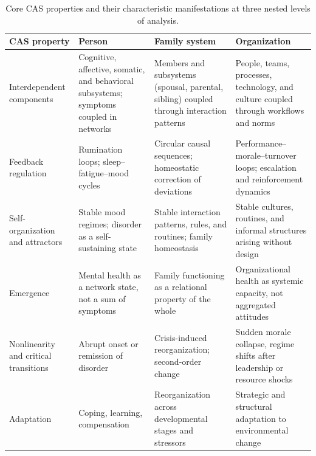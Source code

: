 \documentclass[12pt, letterpaper]{article}
\begin{document}
\begin{table}[htbp]
\centering
\small
\caption{Core CAS properties and their characteristic manifestations at three nested levels of analysis.}
\label{tab:cas-properties}
\begin{tabular}{p{2.9cm}p{3.6cm}p{3.6cm}p{3.8cm}}
\toprule
CAS property & Person & Family system & Organization \\
\midrule
Interdependent components & Cognitive, affective, somatic, and behavioral subsystems; symptoms coupled in networks & Members and subsystems (spousal, parental, sibling) coupled through interaction patterns & People, teams, processes, technology, and culture coupled through workflows and norms \\
\midrule
Feedback regulation & Rumination loops; sleep--fatigue--mood cycles & Circular causal sequences; homeostatic correction of deviations & Performance--morale--turnover loops; escalation and reinforcement dynamics \\
\midrule
Self-organization and attractors & Stable mood regimes; disorder as a self-sustaining state & Stable interaction patterns, rules, and routines; family homeostasis & Stable cultures, routines, and informal structures arising without design \\
\midrule
Emergence & Mental health as a network state, not a sum of symptoms & Family functioning as a relational property of the whole & Organizational health as systemic capacity, not aggregated attitudes \\
\midrule
Nonlinearity and critical transitions & Abrupt onset or remission of disorder & Crisis-induced reorganization; second-order change & Sudden morale collapse, regime shifts after leadership or resource shocks \\
\midrule
Adaptation & Coping, learning, compensation & Reorganization across developmental stages and stressors & Strategic and structural adaptation to environmental change \\
\bottomrule
\end{tabular}
\end{table}
\end{document}
